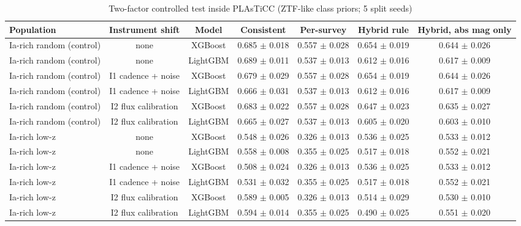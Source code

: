 \begin{table}
\centering
\caption{Two-factor controlled test inside PLAsTiCC (ZTF-like class priors; 5 split seeds)}
\begin{tabular}{lcccccc}
\hline
Population & Instrument shift & Model & Consistent & Per-survey & Hybrid rule & Hybrid, abs mag only \\
\hline
Ia-rich random (control) & none & XGBoost & 0.685 $\pm$ 0.018 & 0.557 $\pm$ 0.028 & 0.654 $\pm$ 0.019 & 0.644 $\pm$ 0.026 \\
Ia-rich random (control) & none & LightGBM & 0.689 $\pm$ 0.011 & 0.537 $\pm$ 0.013 & 0.612 $\pm$ 0.016 & 0.617 $\pm$ 0.009 \\
Ia-rich random (control) & I1 cadence + noise & XGBoost & 0.679 $\pm$ 0.029 & 0.557 $\pm$ 0.028 & 0.654 $\pm$ 0.019 & 0.644 $\pm$ 0.026 \\
Ia-rich random (control) & I1 cadence + noise & LightGBM & 0.666 $\pm$ 0.031 & 0.537 $\pm$ 0.013 & 0.612 $\pm$ 0.016 & 0.617 $\pm$ 0.009 \\
Ia-rich random (control) & I2 flux calibration & XGBoost & 0.683 $\pm$ 0.022 & 0.557 $\pm$ 0.028 & 0.647 $\pm$ 0.023 & 0.635 $\pm$ 0.027 \\
Ia-rich random (control) & I2 flux calibration & LightGBM & 0.665 $\pm$ 0.027 & 0.537 $\pm$ 0.013 & 0.605 $\pm$ 0.020 & 0.603 $\pm$ 0.010 \\
Ia-rich low-z & none & XGBoost & 0.548 $\pm$ 0.026 & 0.326 $\pm$ 0.013 & 0.536 $\pm$ 0.025 & 0.533 $\pm$ 0.012 \\
Ia-rich low-z & none & LightGBM & 0.558 $\pm$ 0.008 & 0.355 $\pm$ 0.025 & 0.517 $\pm$ 0.018 & 0.552 $\pm$ 0.021 \\
Ia-rich low-z & I1 cadence + noise & XGBoost & 0.508 $\pm$ 0.024 & 0.326 $\pm$ 0.013 & 0.536 $\pm$ 0.025 & 0.533 $\pm$ 0.012 \\
Ia-rich low-z & I1 cadence + noise & LightGBM & 0.531 $\pm$ 0.032 & 0.355 $\pm$ 0.025 & 0.517 $\pm$ 0.018 & 0.552 $\pm$ 0.021 \\
Ia-rich low-z & I2 flux calibration & XGBoost & 0.589 $\pm$ 0.005 & 0.326 $\pm$ 0.013 & 0.514 $\pm$ 0.029 & 0.530 $\pm$ 0.010 \\
Ia-rich low-z & I2 flux calibration & LightGBM & 0.594 $\pm$ 0.014 & 0.355 $\pm$ 0.025 & 0.490 $\pm$ 0.025 & 0.551 $\pm$ 0.020 \\
\hline
\end{tabular}
\end{table}

